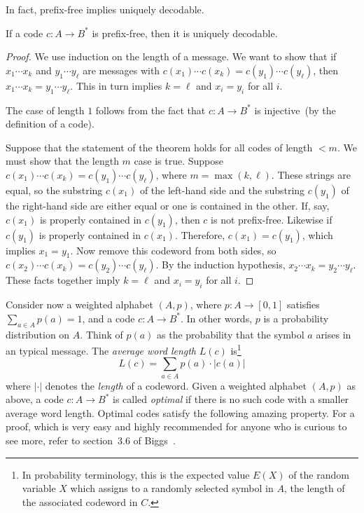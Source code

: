 In fact, prefix-free implies uniquely decodable.

\begin{theorem}
If a code $c: A \longrightarrow B^*$ is prefix-free, then it is
uniquely decodable.
\end{theorem}

\begin{proof}
We use induction on the length of a message. We want to show that if
$x_1 \cdots x_k$ and $y_1 \cdots y_\ell$ are messages with
$c(x_1) \cdots c(x_k) = c(y_1) \cdots c(y_\ell)$, then
$x_1 \cdots x_k = y_1 \cdots y_\ell$. This in turn implies $k = \ell$
and $x_i = y_i$ for all $i$.

The case of length $1$ follows from the fact that
$c: A \longrightarrow B^*$ is injective~(by the definition of a
code).

Suppose that the statement of the theorem holds for all
codes of length $< m$. We must show that the length $m$ case is
true. Suppose $c(x_1) \cdots c(x_k) = c(y_1) \cdots c(y_\ell)$, where
$m = \max(k, \ell)$. These strings are equal, so the substring
$c(x_1)$ of the left-hand side and the substring $c(y_1)$ of the
right-hand side are either equal or one is contained in the other. If,
say, $c(x_1)$ is properly contained in $c(y_1)$, then $c$ is not
prefix-free. Likewise if $c(y_1)$ is properly contained in
$c(x_1)$. Therefore, $c(x_1) = c(y_1)$, which implies $x_1 = y_1$. Now
remove this codeword from both sides, so
$c(x_2) \cdots c(x_k) = c(y_2) \cdots c(y_\ell)$. By the induction
hypothesis, $x_2 \cdots x_k = y_2 \cdots y_\ell$. These facts together
imply $k = \ell$ and $x_i = y_i$ for all $i$.
\end{proof}

Consider now a weighted alphabet $(A,p)$, where
$p: A \longrightarrow [0,1]$ satisfies $\sum_{a \in A}p(a) = 1$, and a
code $c: A \longrightarrow B^*$. In other words, $p$ is a probability
distribution on $A$. Think of $p(a)$ as the probability that the
symbol $a$ arises in an typical message. The
\emph{average word length} $L(c)$ is\footnote{
  In probability terminology, this is the expected value $E(X)$ of the
  random variable $X$ which assigns to a randomly selected symbol in
  $A$, the length of the associated codeword in $C$.
}
\[
L(c)
=
\sum_{a \in A} p(a) \cdot |c(a)|
\]
where $|\cdot|$ denotes the \emph{length} of a codeword.
Given a weighted alphabet $(A,p)$ as above, a code
$c: A \longrightarrow B^*$ is called \emph{optimal} if there is no
such code with a smaller average word length.
Optimal codes satisfy the following amazing property. For a proof,
which is very easy and highly recommended for anyone who is curious to
see more, refer to section~3.6 of Biggs~\cite{Biggs2009}.

